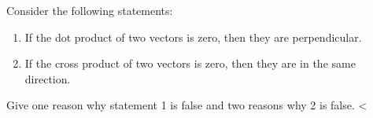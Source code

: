 Consider the following statements:
\begin{enumerate}
\item If the dot product of two vectors is zero, then they are perpendicular.
\item If the cross product of two vectors is zero, then they are in the same direction.
\end{enumerate}
Give one reason why statement 1 is false and two reasons why 2 is false.
<%
